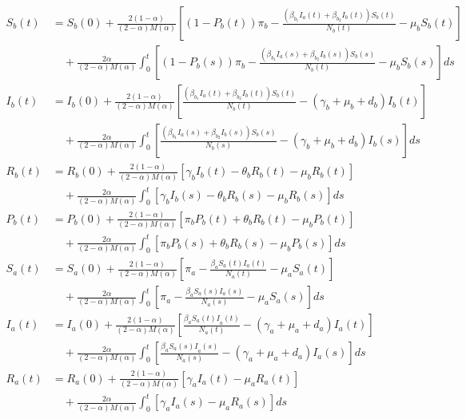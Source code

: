 \documentclass[10pt]{NSP1}
\begin{document}
\begin{equation}
\begin{aligned}
S_{b}(t) &= S_{b}(0) + \frac{2(1 - \alpha)}{(2 - \alpha)M(\alpha)}\left\lbrack \left( 1 - P_{b}(t) \right)\pi_{b} - \frac{\left( \beta_{b_{1}}I_{a}(t) + \beta_{b_{2}}I_{b}(t) \right)S_{b}(t)}{N_{b}(t)} - \mu_{b}S_{b}(t) \right\rbrack \\
&\quad + \frac{2\alpha}{(2 - \alpha)M(\alpha)}\int_{0}^{t}{}\left\lbrack \left( 1 - P_{b}(s) \right)\pi_{b} - \frac{\left( \beta_{b_{1}}I_{a}(s) + \beta_{b_{2}}I_{b}(s) \right)S_{b}(s)}{N_{b}(t)} - \mu_{b}S_{b}(s) \right\rbrack ds \\
I_{b}(t) &= I_{b}(0) + \frac{2(1 - \alpha)}{(2 - \alpha)M(\alpha)}\left\lbrack \frac{\left( \beta_{b_{1}}I_{a}(t) + \beta_{b_{2}}I_{b}(t) \right)S_{b}(t)}{N_{b}(t)} - \left( \gamma_{b} + \mu_{b} + d_{b} \right)I_{b}(t) \right\rbrack \\
&\quad + \frac{2\alpha}{(2 - \alpha)M(\alpha)}\int_{0}^{t}{}\left\lbrack \frac{\left( \beta_{b_{1}}I_{a}(s) + \beta_{b_{2}}I_{b}(s) \right)S_{b}(s)}{N_{b}(s)} - \left( \gamma_{b} + \mu_{b} + d_{b} \right)I_{b}(s) \right\rbrack ds \\
R_{b}(t) &= R_{b}(0) + \frac{2(1 - \alpha)}{(2 - \alpha)M(\alpha)}\left\lbrack \gamma_{b}I_{b}(t) - \theta_{b}R_{b}(t) - \mu_{b}R_{b}(t) \right\rbrack \\
&\quad + \frac{2\alpha}{(2 - \alpha)M(\alpha)}\int_{0}^{t}{}\left\lbrack \gamma_{b}I_{b}(s) - \theta_{b}R_{b}(s) - \mu_{b}R_{b}(s) \right\rbrack ds \\
P_{b}(t) &= P_{b}(0) + \frac{2(1 - \alpha)}{(2 - \alpha)M(\alpha)}\left\lbrack \pi_{b}P_{b}(t) + \theta_{b}R_{b}(t) - \mu_{b}P_{b}(t) \right\rbrack \\
&\quad + \frac{2\alpha}{(2 - \alpha)M(\alpha)}\int_{0}^{t}{}\left\lbrack \pi_{b}P_{b}(s) + \theta_{b}R_{b}(s) - \mu_{b}P_{b}(s) \right\rbrack ds \\
S_{a}(t) &= S_{a}(0) + \frac{2(1 - \alpha)}{(2 - \alpha)M(\alpha)}\left\lbrack \pi_{a} - \frac{\beta_{a}S_{a}(t)I_{a}(t)}{N_{a}(t)} - \mu_{a}S_{a}(t) \right\rbrack \\
&\quad + \frac{2\alpha}{(2 - \alpha)M(\alpha)}\int_{0}^{t}{}\left\lbrack \pi_{a} - \frac{\beta_{a}S_{a}(s)I_{a}(s)}{N_{a}(s)} - \mu_{a}S_{a}(s) \right\rbrack ds \\
I_{a}(t) &= I_{a}(0) + \frac{2(1 - \alpha)}{(2 - \alpha)M(\alpha)}\left\lbrack \frac{\beta_{a}S_{a}{(t)I}_{a}(t)}{N_{a}(t)} - \left( \gamma_{a} + \mu_{a} + d_{a} \right)I_{a}(t) \right\rbrack \\
&\quad + \frac{2\alpha}{(2 - \alpha)M(\alpha)}\int_{0}^{t}{}\left\lbrack \frac{\beta_{a}S_{a}{(s)I}_{a}(s)}{N_{a}(s)} - \left( \gamma_{a} + \mu_{a} + d_{a} \right)I_{a}(s) \right\rbrack ds \\
R_{a}(t) &= R_{a}(0) + \frac{2(1 - \alpha)}{(2 - \alpha)M(\alpha)}\left\lbrack \gamma_{a}I_{a}(t) - \mu_{a}R_{a}(t) \right\rbrack \\
&\quad + \frac{2\alpha}{(2 - \alpha)M(\alpha)}\int_{0}^{t}{}\left\lbrack \gamma_{a}I_{a}(s) - \mu_{a}R_{a}(s) \right\rbrack ds
\end{aligned}
\end{equation}
\end{document}

